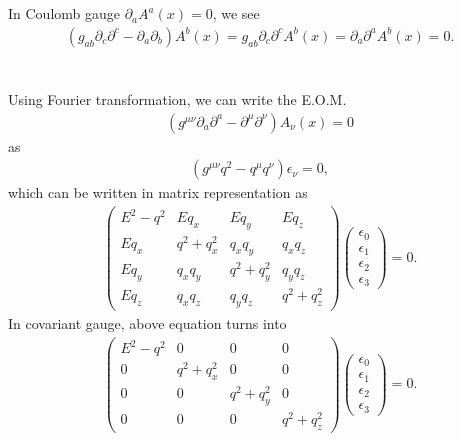 \documentclass[11pt]{article}
\def\del{{\partial}}
\def\eps{\epsilon}
\begin{document}
\section{ }
In Coulomb gauge $\del_a A^a(x) = 0$, we see
\begin{eqnarray}
    (g_{ab} \del_c \del^c -\del_a \del_b) A^b(x) = g_{ab} \del_c \del^c A^b(x) = \del_a \del^a A^b(x) = 0.
\end{eqnarray}

\section{ }
Using Fourier transformation, we can write the E.O.M.
\begin{eqnarray}
    (g^{\mu\nu}\del_a\del^a -\del^\mu\del^\nu) A_\nu(x)= 0
\end{eqnarray}
as
\begin{eqnarray}
    (g^{\mu\nu}q^2 -q^\mu q^\nu )\eps_\nu = 0,
\end{eqnarray}
which can be written in matrix representation as
\begin{eqnarray}
  \begin{pmatrix}
      E^2-q^2 & E q_x & E q_y & E q_z \\
      E q_x & q^2 + q_x^2 & q_xq_y &q_xq_z \\
      E q_y & q_xq_y & q^2+q_y^2 & q_yq_z \\
      Eq_z  & q_xq_z & q_yq_z & q^2+q_z^2
  \end{pmatrix}
  \begin{pmatrix}
      \eps_0\\ \eps_1\\\eps_2\\\eps_3
  \end{pmatrix}
  =0.
\end{eqnarray}
In covariant gauge, above equation turns into
\begin{eqnarray}
    \begin{pmatrix}
        E^2-q^2 & 0 & 0 & 0 \\
        0 & q^2 + q_x^2 & 0 & 0 \\
        0 & 0 & q^2+q_y^2 & 0 \\
        0 & 0 & 0 & q^2+q_z^2
    \end{pmatrix}
    \begin{pmatrix}
        \eps_0\\ \eps_1\\\eps_2\\\eps_3
    \end{pmatrix}
    =0. 
\end{eqnarray}
\end{document}
